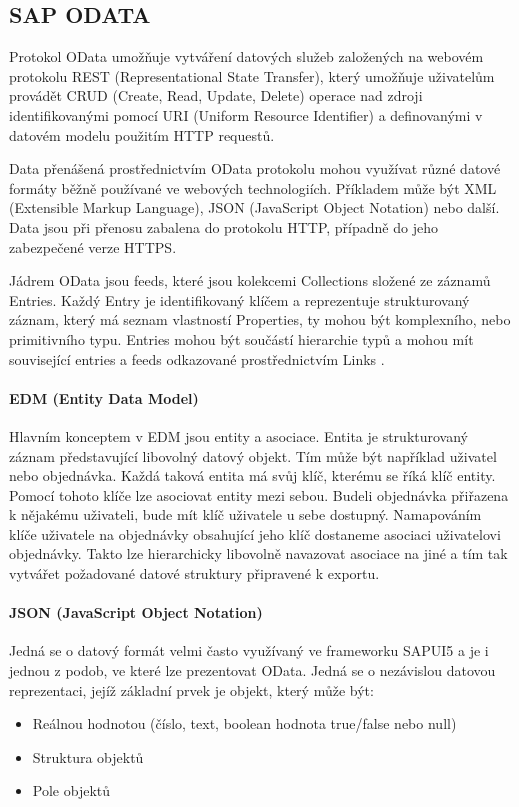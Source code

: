 \documentclass[thesis=M,czech]{FITthesis}[2012/06/26]
\begin{document}
\subsection{SAP ODATA}
\label{ssec:odata}
Protokol OData umožňuje vytváření datových služeb založených na webovém protokolu REST (Representational State Transfer), který umožňuje uživatelům provádět CRUD (Create, Read, Update, Delete) operace nad zdroji identifikovanými pomocí URI (Uniform Resource Identifier) a definovanými v datovém modelu použitím HTTP requestů.

Data přenášená prostřednictvím OData protokolu mohou využívat různé datové formáty běžně používané ve webových technologiích. Příkladem  může být XML (Extensible Markup Language), JSON (JavaScript Object Notation) nebo další. Data jsou při přenosu zabalena do protokolu HTTP, případně do jeho zabezpečené verze HTTPS.

Jádrem OData jsou feeds, které jsou kolekcemi Collections složené ze záznamů Entries. Každý Entry je identifikovaný klíčem a reprezentuje strukturovaný záznam, který má seznam vlastností Properties, ty mohou být komplexního, nebo primitivního typu. Entries mohou být součástí hierarchie typů a mohou mít související entries a feeds odkazované prostřednictvím Links \cite{mvc}.

\paragraph{EDM (Entity Data Model)} Hlavním konceptem v EDM jsou entity a asociace. Entita je strukturovaný záznam představující libovolný datový objekt. Tím může být například uživatel nebo objednávka. Každá taková entita má svůj klíč, kterému se říká klíč entity. Pomocí tohoto klíče lze asociovat entity mezi sebou. Budeli objednávka přiřazena k nějakému uživateli, bude mít klíč uživatele u sebe dostupný. Namapováním klíče uživatele na objednávky obsahující jeho klíč dostaneme asociaci uživatelovi objednávky. Takto lze hierarchicky libovolně navazovat asociace na jiné a tím tak vytvářet požadované datové struktury připravené k exportu. 

\paragraph{JSON (JavaScript Object Notation)}
\label{par:json}
Jedná se o datový formát velmi často využívaný ve frameworku SAPUI5 a je i jednou z podob, ve které lze prezentovat OData. Jedná se o nezávislou datovou reprezentaci, jejíž základní prvek je objekt, který může být:
\begin{itemize}
	\item
	Reálnou hodnotou (číslo, text, boolean hodnota true/false nebo null)
	\item
	Struktura objektů
    \item
	Pole objektů	
\end{itemize} 
\end{document}

